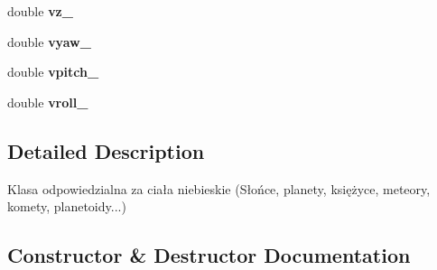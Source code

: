 \begin{DoxyCompactItemize}
\item 
double {\bfseries vz\+\_\+}\hypertarget{class_orb_a1179f690e6cbf52d4da73456730d36cd}{}\label{class_orb_a1179f690e6cbf52d4da73456730d36cd}

\item 
double {\bfseries vyaw\+\_\+}\hypertarget{class_orb_a83a8feef3eccee3b8977685c0228f855}{}\label{class_orb_a83a8feef3eccee3b8977685c0228f855}

\item 
double {\bfseries vpitch\+\_\+}\hypertarget{class_orb_abbc25532d1d10ad83e9fbd0f5c0c3d87}{}\label{class_orb_abbc25532d1d10ad83e9fbd0f5c0c3d87}

\item 
double {\bfseries vroll\+\_\+}\hypertarget{class_orb_a78b287c4625470fba356017276a8e300}{}\label{class_orb_a78b287c4625470fba356017276a8e300}

\end{DoxyCompactItemize}


\subsection{Detailed Description}
Klasa odpowiedzialna za ciała niebieskie (Słońce, planety, księżyce, meteory, komety, planetoidy...) 

\subsection{Constructor \& Destructor Documentation}
